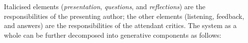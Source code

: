 
Italicised elements (\emph{presentation}, \emph{questions}, and
\emph{reflections}) are the responsibilities of the presenting author; the other
elements (listening, feedback, and answers) are the responsibilities of the attendant critics.
%
The system as a whole can be further decomposed into generative
components as follows:

\bigskip


